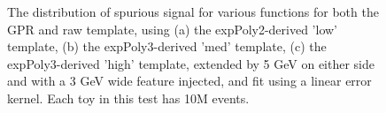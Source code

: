 \begin{figure} 
\begin{center}

\caption{The distribution of spurious signal for various functions for both the GPR and raw template, using (a) the expPoly2-derived 'low' template, (b) the expPoly3-derived 'med' template, (c) the expPoly3-derived 'high' template, extended by 5 GeV on either side and with a 3 GeV wide feature injected, and fit using a linear error kernel. Each toy in this test has 10M events.}
\label{fig:linearkernel_lowpt_10M_Sig_1s}
\end{center}
\end{figure}
				
